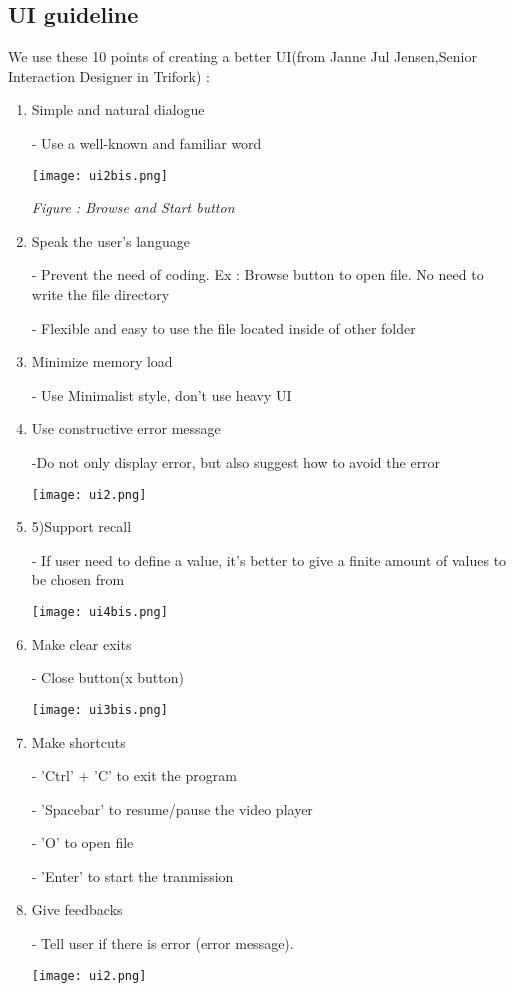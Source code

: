 \documentclass[12pt,a4paper]{article}
\begin{document}
\subsection{UI guideline}
We use these 10 points of creating a better UI(from Janne Jul Jensen,Senior Interaction Designer in Trifork) :
\begin{enumerate}
\item Simple and natural dialogue
	\par - Use a well-known and familiar word
	\par \vspace{0.25cm}\texttt{[image: ui2bis.png]}
	\par \textit{Figure : Browse and Start button}
\item Speak the user’s language
	\par - Prevent the need of coding. Ex : Browse button to open file. No need to write the file directory 
	\par - Flexible and easy to use the file located inside of other folder
\item Minimize memory load
	\par - Use Minimalist style, don’t use heavy UI
\item Use constructive error message
	\par -Do not only display error, but also suggest how to avoid the error
	\par \texttt{[image: ui2.png]}
\item 5)Support recall
	\par - If user need to define a value, it’s better to give a finite amount of values to be chosen from
	\par \texttt{[image: ui4bis.png]}
\item Make clear exits
	\par- Close button(x button)
	\par \texttt{[image: ui3bis.png]}
\item Make shortcuts
	\par - 'Ctrl' + 'C' to exit the program
	\par - 'Spacebar' to resume/pause the video player
	\par - 'O' to open file 
	\par - 'Enter' to start the tranmission
\item Give feedbacks
	\par - Tell user if there is error (error message).
	\par \texttt{[image: ui2.png]}

\end{enumerate}
\end{document}
